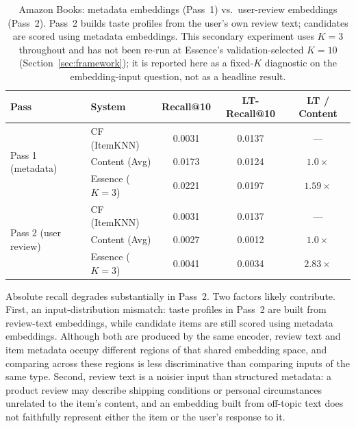 \documentclass[11pt,a4paper]{article}
\begin{document}
\begin{table}[H]
\centering
\caption{Amazon Books: metadata embeddings (Pass~1) vs.\ user-review
         embeddings (Pass~2). Pass~2 builds taste profiles from the user's
         own review text; candidates are scored using metadata embeddings.
         This secondary experiment uses $K=3$ throughout and has not been
         re-run at Essence's validation-selected $K=10$ (Section~\ref{sec:framework});
         it is reported here as a fixed-$K$ diagnostic on the embedding-input
         question, not as a headline result.}
\label{tab:amazon_pass2}
\begin{tabular}{llccc}
\toprule
\textbf{Pass} & \textbf{System} & \textbf{Recall@10}
              & \textbf{LT-Recall@10} & \textbf{LT / Content} \\
\midrule
\multirow{3}{*}{Pass 1 (metadata)}
  & CF (ItemKNN)    & 0.0031 & 0.0137 & ---          \\
  & Content (Avg)   & 0.0173 & 0.0124 & $1.0\times$  \\
  & Essence ($K=3$) & 0.0221 & 0.0197 & $1.59\times$ \\
\midrule
\multirow{3}{*}{Pass 2 (user review)}
  & CF (ItemKNN)    & 0.0031 & 0.0137 & ---          \\
  & Content (Avg)   & 0.0027 & 0.0012 & $1.0\times$  \\
  & Essence ($K=3$) & 0.0041 & 0.0034 & $2.83\times$ \\
\bottomrule
\end{tabular}
\end{table}

Absolute recall degrades substantially in Pass~2. Two factors likely
contribute. First, an input-distribution mismatch: taste profiles in Pass~2 are built from
review-text embeddings, while candidate items are still scored using metadata embeddings.
Although both are produced by the same encoder, review text and item metadata occupy
different regions of that shared embedding space, and comparing across these regions is
less discriminative than comparing inputs of the same type. Second,
review text is a noisier input than structured metadata: a product review
may describe shipping conditions or personal circumstances unrelated to the
item's content, and an embedding built from off-topic text does not
faithfully represent either the item or the user's response to it.
\end{document}
